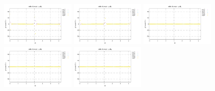 \noindent
\includegraphics[width=3.5cm]{python_codes/fieldstone_152/RESULTS/exp1_2D/qqq_32_m2}
\includegraphics[width=3.5cm]{python_codes/fieldstone_152/RESULTS/exp1_2D/qqq_32_m3}
\includegraphics[width=3.5cm]{python_codes/fieldstone_152/RESULTS/exp1_2D/qqq_32_m4}
\includegraphics[width=3.5cm]{python_codes/fieldstone_152/RESULTS/exp1_2D/qqq_32_m5}
\includegraphics[width=3.5cm]{python_codes/fieldstone_152/RESULTS/exp1_2D/qqq_32_m6}

